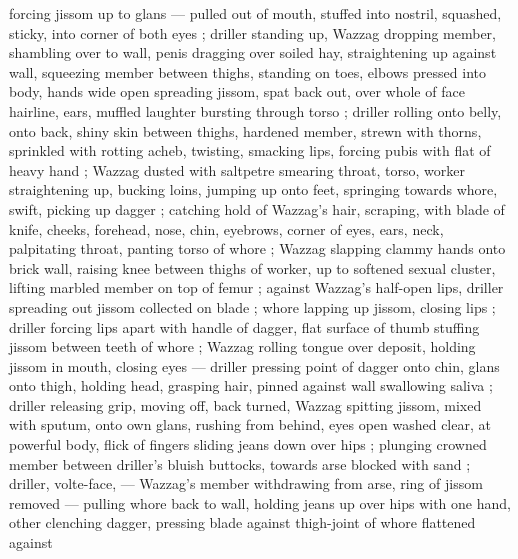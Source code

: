 forcing jissom up to glans --- pulled out of mouth, stuffed into nostril, squashed, sticky, into corner of both eyes ; driller standing up, Wazzag dropping member, shambling over to wall, penis dragging over soiled hay, straightening up against wall, squeezing member between thighs, standing on toes, elbows pressed into body, hands wide open spreading jissom, spat back out, over whole of face {\col} hairline, ears, muffled laughter bursting through torso ; driller rolling onto belly, onto back, shiny skin between thighs, hardened member, strewn with thorns, sprinkled with rotting acheb, twisting, smacking lips, forcing pubis with flat of heavy hand ; Wazzag dusted with saltpetre smearing throat, torso, worker straightening up, bucking loins, jumping up onto feet, springing towards whore, swift, picking up dagger  ; catching hold of Wazzag's hair, scraping, with blade of knife, cheeks, forehead, nose, chin, eyebrows, corner of eyes, ears, neck, palpitating throat, panting torso of whore ; Wazzag slapping clammy hands onto brick wall, raising knee between thighs of worker, up to softened sexual cluster, lifting marbled member on top of femur ; against Wazzag's half-open lips, driller spreading out jissom collected on blade ; whore lapping up jissom, closing lips ; driller forcing lips apart with handle of dagger, flat surface of thumb stuffing jissom between teeth of whore ; Wazzag rolling tongue over deposit, holding jissom in mouth, closing eyes --- driller pressing point of dagger onto chin, glans onto thigh, holding head, grasping hair, pinned against wall {\dashcol} swallowing saliva ; driller releasing grip, moving off, back turned, Wazzag spitting jissom, mixed with sputum, onto own glans, rushing from behind, eyes open washed clear, at powerful body, flick of fingers sliding jeans down over hips ; plunging crowned member between driller's bluish buttocks, towards arse blocked with sand ; driller, volte-face, --- Wazzag's member withdrawing from arse, ring of jissom removed --- pulling whore back to wall, holding jeans up over hips with one hand, other clenching dagger, pressing blade against thigh-joint of whore flattened against 
